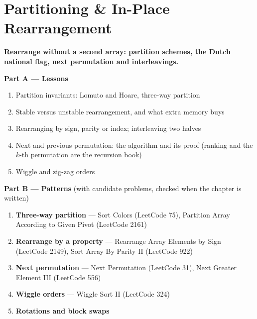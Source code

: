 \chapter{Partitioning \& In-Place Rearrangement}
\label{ch:partitioning}

\begin{tcolorbox}[enhanced, colback=white, colframe=secondaryblue, boxrule=1pt, arc=2mm]
\textbf{\large\textcolor{primaryblue}{Rearrange without a second array: partition schemes, the Dutch national flag, next permutation and interleavings.}}
\end{tcolorbox}


\begin{plannedbox}
\textbf{Part A --- Lessons}
\begin{enumerate}[leftmargin=*, label=\textbf{A\arabic*.}, itemsep=1pt]
    \item Partition invariants: Lomuto and Hoare, three-way partition
    \item Stable versus unstable rearrangement, and what extra memory buys
    \item Rearranging by sign, parity or index; interleaving two halves
    \item Next and previous permutation: the algorithm and its proof (ranking and the $k$-th permutation are the recursion book)
    \item Wiggle and zig-zag orders
\end{enumerate}
\textbf{Part B --- Patterns} (with candidate problems, checked when the chapter is written)
\begin{enumerate}[leftmargin=*, label=\textbf{P\arabic*.}, itemsep=1pt]
    \item \textbf{Three-way partition} --- Sort Colors {\small\color{darkgray}(LeetCode 75)}, Partition Array According to Given Pivot {\small\color{darkgray}(LeetCode 2161)}
    \item \textbf{Rearrange by a property} --- Rearrange Array Elements by Sign {\small\color{darkgray}(LeetCode 2149)}, Sort Array By Parity II {\small\color{darkgray}(LeetCode 922)}
    \item \textbf{Next permutation} --- Next Permutation {\small\color{darkgray}(LeetCode 31)}, Next Greater Element III {\small\color{darkgray}(LeetCode 556)}
    \item \textbf{Wiggle orders} --- Wiggle Sort II {\small\color{darkgray}(LeetCode 324)}
    \item \textbf{Rotations and block swaps}
\end{enumerate}
\end{plannedbox}
